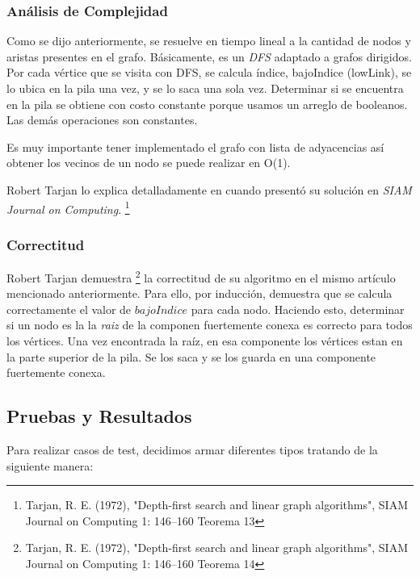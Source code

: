 
\subsubsection{Análisis de Complejidad}

\quad Como se dijo anteriormente, se resuelve en tiempo lineal a la cantidad de nodos y aristas presentes en el grafo. Básicamente, es un \textit{DFS} adaptado a grafos dirigidos. Por cada vértice que se visita con DFS, se calcula índice, bajoIndice (lowLink), se lo ubica en la pila una vez, y se lo saca una sola vez. Determinar si se encuentra en la pila se obtiene con costo constante porque usamos un arreglo de booleanos. Las demás operaciones son constantes.

\quad Es muy importante tener implementado el grafo con lista de adyacencias así obtener los vecinos de un nodo se puede realizar en O(1).

\quad

\quad Robert Tarjan lo explica detalladamente en cuando presentó su solución en \textit{SIAM Journal on Computing}. \footnote{ Tarjan, R. E. (1972), "Depth-first search and linear graph algorithms", SIAM Journal on Computing 1: 146–160 Teorema 13}

\subsubsection{Correctitud}

\quad Robert Tarjan demuestra \footnote{ Tarjan, R. E. (1972), "Depth-first search and linear graph algorithms", SIAM Journal on Computing 1: 146–160 Teorema 14} la correctitud de su algoritmo en el mismo artículo mencionado anteriormente. Para ello, por inducción, demuestra que se calcula correctamente el valor de $ bajoIndice $ para cada nodo. Haciendo esto, determinar si un nodo es la la \textit{raiz} de la componen fuertemente conexa es correcto para todos los vértices. Una vez encontrada la raíz, en esa componente los vértices estan en la parte superior de la pila. Se los saca y se los guarda en una componente fuertemente conexa.

\subsection{Pruebas y Resultados}


\quad Para realizar casos de test, decidimos armar diferentes tipos tratando de la siguiente manera:

